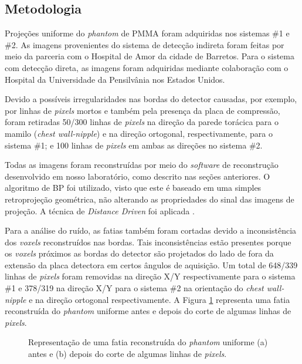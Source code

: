 \subsection{Metodologia} \label{Metodologia}

Projeções uniforme do \textit{phantom} de \acs{PMMA} foram adquiridas nos sistemas \#1 e \#2. As imagens provenientes do sistema de detecção indireta foram feitas por meio da parceria com o Hospital de Amor da cidade de Barretos. Para o sistema com detecção direta, as imagens foram adquiridas mediante colaboração com o Hospital da Universidade da Pensilvânia nos Estados Unidos. 

Devido a possíveis irregularidades nas bordas do detector causadas, por exemplo, por linhas de \textit{pixels} mortos e também pela presença da placa de compressão, foram retiradas 50/300 linhas de \textit{pixels} na direção da parede torácica para o mamilo (\textit{chest wall-nipple}) e na direção ortogonal, respectivamente, para o sistema \#1; e 100 linhas de \textit{pixels} em ambas as direções no sistema \#2.

Todas as imagens foram reconstruídas por meio do \textit{software} de reconstrução desenvolvido em nosso laboratório, como descrito nas seções anteriores. O algoritmo de \acs{BP} foi utilizado, visto que este é baseado em uma simples retroprojeção geométrica, não alterando as propriedades do sinal das imagens de projeção. A técnica de \textit{Distance Driven} foi aplicada \cite{de2004distance}. 

Para a análise do ruído, as fatias também foram cortadas devido a inconsistência dos \textit{voxels} reconstruídos nas bordas. Tais inconsistências estão presentes porque os \textit{voxels} próximos as bordas do detector são projetados do lado de fora da extensão da placa detectora em certos ângulos de aquisição. Um total de 648/339 linhas de \textit{pixels} foram removidas na direção X/Y respectivamente para o sistema \#1 e 378/319 na direção X/Y para o sistema \#2 na orientação do \textit{chest wall-nipple} e na direção ortogonal respectivamente. A Figura \ref{fig:imgCap4ReconUniform} representa uma fatia reconstruída do \textit{phantom} uniforme antes e depois do corte de algumas linhas de \textit{pixels}.

\begin{figure}[H]
	\centering	
	\caption{Representação de uma fatia reconstruída do \textit{phantom} uniforme (a) antes e (b) depois do corte de algumas linhas de \textit{pixels}.}
	
	\hfill
	
	\label{fig:imgCap4ReconUniform}
\end{figure}

